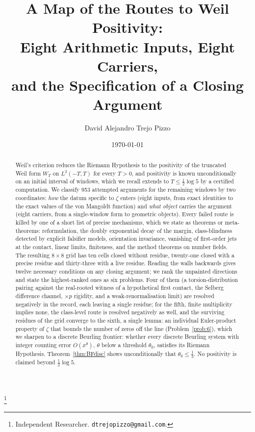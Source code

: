 \documentclass[11pt]{amsart}
\theoremstyle{definition}
\theoremstyle{remark}
\begin{document}
\title[A map of the routes to Weil positivity]
{A Map of the Routes to Weil Positivity:\\
Eight Arithmetic Inputs, Eight Carriers,\\
and the Specification of a Closing Argument}

\author{David Alejandro Trejo Pizzo}
\thanks{Independent Researcher. \texttt{dtrejopizzo@gmail.com}.}

\date{\today}

\begin{abstract}
Weil's criterion reduces the Riemann Hypothesis to the positivity of the truncated Weil form
$W_T$ on $L^2(-T,T)$ for every $T>0$, and positivity is known unconditionally on an initial
interval of windows, which we recall extends to $T\le\frac12\log5$ by a certified computation. We
classify 953 attempted arguments for the remaining windows by two coordinates: \emph{how} the datum
specific to $\zeta$ enters (eight inputs, from exact identities to the exact values of the von
Mangoldt function) and \emph{what object} carries the argument (eight carriers, from a single-window
form to geometric objects). Every failed route is killed by one of a short list of precise
mechanisms, which we state as theorems or meta-theorems: reformulation, the doubly exponential decay
of the margin, class-blindness detected by explicit falsifier models, orientation invariance,
vanishing of first-order jets at the contact, linear limits, finiteness, and the method theorems on
number fields. The resulting $8\times8$ grid has ten cells closed without residue, twenty-one closed with
a precise residue and thirty-three with a live residue. Reading the walls backwards gives twelve
necessary conditions on any closing argument; we rank the unpainted directions and state the
highest-ranked ones as six problems. Four of them (a torsion-distribution pairing against the real-rooted witness of a
hypothetical first contact, the Selberg difference channel, $\times p$ rigidity, and a weak-renormalisation
limit) are resolved negatively in the record, each leaving a single residue; for the fifth, finite
multiplicity implies none, the class-level route is resolved negatively as well, and the surviving residues
of the grid converge to the sixth, a single lemma: an individual Euler-product property of $\zeta$ that bounds the
number of zeros off the line (Problem~\ref{prob:6}), which we sharpen to a discrete Beurling frontier: whether every discrete Beurling system with integer counting error $O(x^\theta)$, $\theta$ below a threshold $\theta_0$, satisfies its Riemann Hypothesis. Theorem~\ref{thm:BFdisc} shows unconditionally that $\theta_0\le\frac13$. No positivity is claimed beyond $\frac12\log5$.
\end{abstract}
\end{document}
